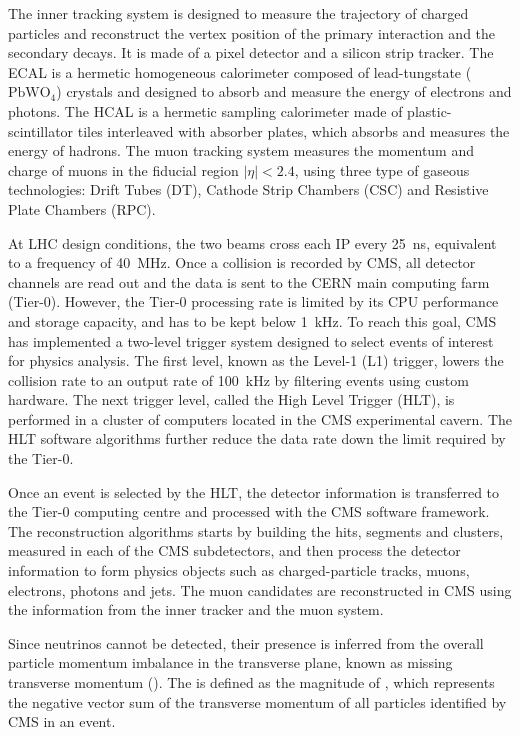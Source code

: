 The inner tracking system is designed to measure the trajectory of charged particles and reconstruct the  vertex position of the primary interaction and the secondary decays. It is made of a pixel detector and a silicon strip tracker. The ECAL is a hermetic homogeneous calorimeter composed of lead-tungstate ($\text{PbWO}_{4}$) crystals and designed to absorb and measure the energy of electrons and photons. The HCAL is a hermetic sampling calorimeter made of plastic-scintillator tiles interleaved with absorber plates, which absorbs and measures the energy of hadrons. The muon tracking system measures the momentum and charge of muons in the fiducial region $|\eta| < 2.4$, using three type of gaseous technologies: Drift Tubes (DT), Cathode Strip Chambers (CSC) and Resistive Plate Chambers (RPC).

At LHC design conditions, the two beams cross each IP every \SI{25}{\ns}, equivalent to a frequency of \SI{40}{\MHz}. Once a collision is recorded by CMS, all detector channels are read out and the data is sent to the CERN main computing farm (Tier-0). However, the Tier-0 processing rate is limited by its CPU performance and storage capacity, and has to be kept below \SI{1}{\kHz}. To reach this goal, CMS has implemented a two-level trigger system designed to select events of interest for physics analysis. The first level, known as the Level-1 (L1) trigger, lowers the collision rate to an output rate of \SI{100}{\kHz} by filtering events using custom hardware. The next trigger level, called the High Level Trigger (HLT), is performed in a cluster of computers located in the CMS experimental cavern. The HLT software algorithms further reduce the data rate down the limit required by the Tier-0.

Once an event is selected by the HLT, the detector information is transferred to the Tier-0 computing centre and processed with the CMS software framework. The reconstruction algorithms starts by building the hits, segments and clusters, measured in each of the CMS subdetectors, and then process the detector information to form physics objects such as charged-particle tracks, muons, electrons, photons and jets. The muon candidates are reconstructed in CMS using the information from the inner tracker and the muon system.

Since neutrinos cannot be detected, their presence is inferred from the overall particle momentum imbalance in the transverse plane, known as missing transverse momentum (\ptmiss). The \ptmiss is defined as the magnitude of \ptvecmiss, which represents the negative vector sum of the transverse momentum of all particles identified by CMS in an event.


